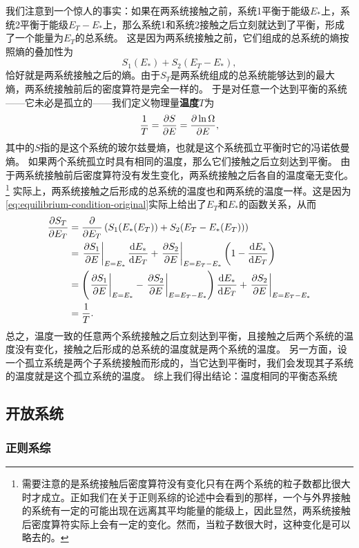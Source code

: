 \documentclass[hyperref, UTF8, a4paper]{ctexart}
\begin{document}
我们注意到一个惊人的事实：如果在两系统接触之前，系统1平衡于能级$E_*$上，系统2平衡于能级$E_T-E_*$上，那么系统1和系统2接触之后立刻就达到了平衡，形成了一个能量为$E_T$的总系统。
这是因为两系统接触之前，它们组成的总系统的熵按照熵的叠加性为
\[
    S_1(E_*) + S_2(E_T-E_*),
\]
恰好就是两系统接触之后的熵。由于$S_T$是两系统组成的总系统能够达到的最大熵，两系统接触前后的密度算符是完全一样的。
于是对任意一个达到平衡的系统——它未必是孤立的——我们定义物理量\textbf{温度}$T$为
\begin{equation}
    \frac{1}{T} = \pdv{S}{E} = \pdv{\ln \Omega}{E},
\end{equation}
其中的$S$指的是这个系统的玻尔兹曼熵，也就是这个系统孤立平衡时它的冯诺依曼熵。
如果两个系统孤立时具有相同的温度，那么它们接触之后立刻达到平衡。
由于两系统接触前后密度算符没有发生变化，两系统接触之后各自的温度毫无变化。%
\footnote{需要注意的是系统接触后密度算符没有变化只有在两个系统的粒子数都比很大时才成立。正如我们在关于正则系综的论述中会看到的那样，一个与外界接触的系统有一定的可能出现在远离其平均能量的能级上，因此显然，两系统接触后密度算符实际上会有一定的变化。然而，当粒子数很大时，这种变化是可以略去的。}%
实际上，两系统接触之后形成的总系统的温度也和两系统的温度一样。这是因为\eqref{eq:equilibrium-condition-original}实际上给出了$E_T$和$E_*$的函数关系，从而
\[
    \begin{aligned}
        \pdv{S_T}{E_T} &= \pdv{E_T} \left(S_1(E_*(E_T)) + S_2(E_T-E_*(E_T))\right) \\
        &= \eval{\pdv{S_1}{E}}_{E=E_*} \dv{E_*}{E_T} + \eval{\pdv{S_2}{E}}_{E=E_T-E_*} \left( 1 - \dv{E_*}{E_T} \right) \\
        &= \left( \eval{\pdv{S_1}{E}}_{E=E_*} - \eval{\pdv{S_2}{E}}_{E=E_T-E_*} \right) \dv{E_*}{E_T} + \eval{\pdv{S_2}{E}}_{E=E_T-E_*} \\
        &= \frac{1}{T}.
    \end{aligned}
\]
总之，温度一致的任意两个系统接触之后立刻达到平衡，且接触之后两个系统的温度没有变化，接触之后形成的总系统的温度就是两个系统的温度。
另一方面，设一个孤立系统是两个子系统接触而形成的，当它达到平衡时，我们会发现其子系统的温度就是这个孤立系统的温度。
综上我们得出结论：温度相同的平衡态系统

\subsection{开放系统}

\subsubsection{正则系综}
\end{document}
